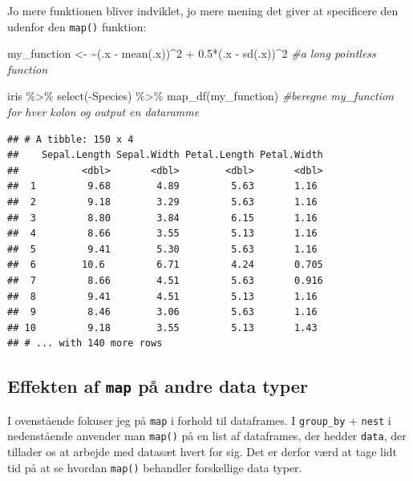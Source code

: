 \documentclass[
]{book}
\newenvironment{Shaded}{\begin{snugshade}}{\end{snugshade}}
\newcommand{\CommentTok}[1]{\textcolor[rgb]{0.56,0.35,0.01}{\textit{#1}}}
\newcommand{\DecValTok}[1]{\textcolor[rgb]{0.00,0.00,0.81}{#1}}
\newcommand{\ErrorTok}[1]{\textcolor[rgb]{0.64,0.00,0.00}{\textbf{#1}}}
\newcommand{\FloatTok}[1]{\textcolor[rgb]{0.00,0.00,0.81}{#1}}
\newcommand{\FunctionTok}[1]{\textcolor[rgb]{0.00,0.00,0.00}{#1}}
\newcommand{\NormalTok}[1]{#1}
\newcommand{\OtherTok}[1]{\textcolor[rgb]{0.56,0.35,0.01}{#1}}
\newcommand{\SpecialCharTok}[1]{\textcolor[rgb]{0.00,0.00,0.00}{#1}}
\begin{document}
Jo mere funktionen bliver indviklet, jo mere mening det giver at specificere den udenfor den \texttt{map()} funktion:

\begin{Shaded}
\begin{Highlighting}[]
\NormalTok{my\_function }\OtherTok{\textless{}{-}} \ErrorTok{\textasciitilde{}}\NormalTok{(.x }\SpecialCharTok{{-}} \FunctionTok{mean}\NormalTok{(.x))}\SpecialCharTok{\^{}}\DecValTok{2} \SpecialCharTok{+} \FloatTok{0.5}\SpecialCharTok{*}\NormalTok{(.x }\SpecialCharTok{{-}} \FunctionTok{sd}\NormalTok{(.x))}\SpecialCharTok{\^{}}\DecValTok{2} \CommentTok{\#a long pointless function}

\NormalTok{iris }\SpecialCharTok{\%\textgreater{}\%}
  \FunctionTok{select}\NormalTok{(}\SpecialCharTok{{-}}\NormalTok{Species) }\SpecialCharTok{\%\textgreater{}\%}
  \FunctionTok{map\_df}\NormalTok{(my\_function) }\CommentTok{\#beregne my\_function for hver kolon og output en dataramme }
\end{Highlighting}
\end{Shaded}

\begin{verbatim}
## # A tibble: 150 x 4
##    Sepal.Length Sepal.Width Petal.Length Petal.Width
##           <dbl>       <dbl>        <dbl>       <dbl>
##  1         9.68        4.89         5.63       1.16 
##  2         9.18        3.29         5.63       1.16 
##  3         8.80        3.84         6.15       1.16 
##  4         8.66        3.55         5.13       1.16 
##  5         9.41        5.30         5.63       1.16 
##  6        10.6         6.71         4.24       0.705
##  7         8.66        4.51         5.63       0.916
##  8         9.41        4.51         5.13       1.16 
##  9         8.46        3.06         5.63       1.16 
## 10         9.18        3.55         5.13       1.43 
## # ... with 140 more rows
\end{verbatim}

\hypertarget{effekten-af-map-puxe5-andre-data-typer}{%
\subsection{\texorpdfstring{Effekten af \texttt{map} på andre data typer}{Effekten af map på andre data typer}}\label{effekten-af-map-puxe5-andre-data-typer}}

I ovenstående fokuser jeg på \texttt{map} i forhold til dataframes. I \texttt{group\_by} + \texttt{nest} i nedenstående anvender man \texttt{map()} på en list af dataframes, der hedder \texttt{data}, der tillader os at arbejde med datasæt hvert for sig. Det er derfor værd at tage lidt tid på at se hvordan \texttt{map()} behandler forskellige data typer.
\end{document}
